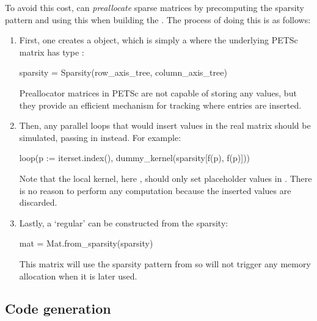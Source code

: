 \documentclass[thesis]{subfiles}
\begin{document}
To avoid this cost,  can \emph{preallocate} sparse matrices by precomputing the sparsity pattern and using this when building the .
The process of doing this is as follows:
\begin{enumerate}
  \item
    First, one creates a  object, which is simply a   where the underlying PETSc matrix has type :
    \begin{pyinline}
      sparsity = Sparsity(row_axis_tree, column_axis_tree)
    \end{pyinline}
    Preallocator matrices in PETSc are not capable of storing any values, but they provide an efficient mechanism for tracking where entries are inserted.
  \item
    Then, any parallel loops that would insert values in the real matrix should be simulated, passing in  instead.
    For example:
    \begin{pyinline}
      loop(p := iterset.index(), dummy_kernel(sparsity[f(p), f(p)]))
    \end{pyinline}
    Note that the local kernel, here , should only set placeholder values in .
    There is no reason to perform any computation because the inserted values are discarded.
  \item
    Lastly, a `regular'  can be constructed from the sparsity:
    \begin{pyinline}
      mat = Mat.from_sparsity(sparsity)
    \end{pyinline}
    This matrix will use the sparsity pattern from  so will not trigger any memory allocation when it is later used.
\end{enumerate}

\subsection{Code generation}
\label{sec:impl_matrices_codegen}
\end{document}
